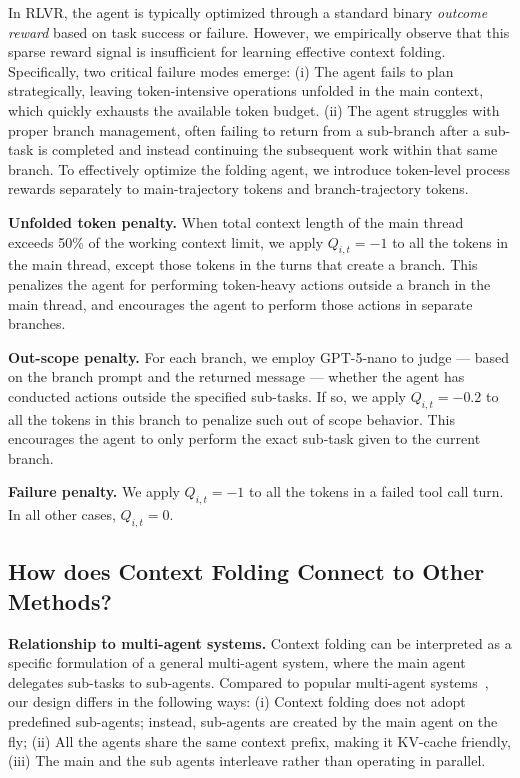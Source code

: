 In RLVR, the agent is typically optimized through a standard binary \textit{outcome reward} based on task success or failure.
However, we empirically observe that this sparse reward signal is insufficient for learning effective context folding. 
Specifically, two critical failure modes emerge:
(i) The agent fails to plan strategically, leaving token-intensive operations unfolded in the main context, which quickly exhausts the available token budget.
(ii) The agent struggles with proper branch management, often failing to return from a sub-branch after a sub-task is completed and instead continuing the subsequent work within that same branch.
To effectively optimize the folding agent, we introduce token-level process rewards separately to main-trajectory tokens and branch-trajectory tokens.

\noindent \textbf{Unfolded token penalty.} When total context length of the main thread exceeds 50\% of the working context limit, we apply $Q_{i,t}=-1$ to all the tokens in the main thread, except those tokens in the turns that create a branch. This penalizes the agent for performing token-heavy actions outside a branch in the main thread, and encourages the agent to perform those actions in separate branches.

\noindent \textbf{Out-scope penalty.} For each branch, we employ GPT-5-nano to judge — based on the branch prompt and the returned message — whether the agent has conducted actions outside the specified sub-tasks. If so, we apply $Q_{i,t}=-0.2$ to all the tokens in this branch to penalize such out of scope behavior.
This encourages the agent to only perform the exact sub-task given to the current branch.

\textbf{Failure penalty.} We apply $Q_{i,t}=-1$ to all the tokens in a failed tool call turn. 
In all other cases, $Q_{i,t}=0$.



\subsection{How does Context Folding Connect to Other Methods?}
\textbf{Relationship to multi-agent systems.}
Context folding can be interpreted as a specific formulation of a general multi-agent system, where the main agent delegates sub-tasks to sub-agents.
Compared to popular multi-agent systems~\citep{Hadfield2025}, our design differs in the following ways:
(i) Context folding does not adopt predefined sub-agents; instead, sub-agents are created by the main agent on the fly;
(ii) All the agents share the same context prefix, making it KV-cache friendly,
(iii) The main and the sub agents interleave rather than operating in parallel.


